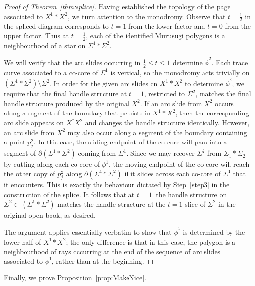 \documentclass{amsart}
\theoremstyle{definition}
\begin{document}
\begin{proof}[Proof of Theorem~\ref{thm:splice}]  Having  established the topology of the page associated to $X^1*X^2$, we turn attention to the monodromy.
Observe that $t=\frac{1}{2}$ in the spliced diagram corresponds to $t=1$ from the lower factor and $t=0$ from the upper factor.  Thus at $t=\frac{1}{2}$, each of the identified Murusugi polygons is a neighbourhood of a star on $\Sigma^1*\Sigma^2$.  

We will verify that the arc slides occurring in $\frac{1}{2}\leq t\leq 1$ determine $\overline{\phi}^2$.  Each trace curve associated to a co-core of $\Sigma^1$ is vertical, so the monodromy acts trivially on $(\Sigma^1*\Sigma^2)\setminus \Sigma^2$.  
In order for the given arc slides on $X^1*X^2$ to determine $\overline{\phi}^2$, we require that the final handle structure at $t=1$, restricted to $\Sigma^2$, matches the final handle structure produced by the original $X^2$. If an arc slide from $X^2$ occurs along a segment of the boundary that persists in $X^1*X^2$, then the corresponding arc slide appears on $X^*X^2$ and changes the handle structure identically.  However, an arc slide from $X^2$ may also occur along a segment of the boundary containing a point $p_j^2$.  In this case, the sliding endpoint of the co-core will pass into a segment of $\partial(\Sigma^1*\Sigma^2)$ coming from $\Sigma^1$. 
Since we may recover $\Sigma^2$ from $\Sigma_{1} * \Sigma_2$ by cutting along each co-core of $\phi^1$, the moving endpoint of the co-core will reach the other copy of $p_j^2$ along $\partial(\Sigma^1*\Sigma^2)$ if it slides across each co-core of $\Sigma^1$ that it encounters.  This is exactly the behaviour dictated by Step~\ref{step3} in the construction of the splice.  It follows that at $t=1$, the handle structure on $\Sigma^2\subset(\Sigma^1*\Sigma^2)$ matches the handle structure at the $t=1$ slice of $\Sigma^2$ in the original open book, as desired.  

The argument applies essentially verbatim to show that $\overline{\phi}^1$ is determined by the lower half of $X^1*X^2$; the only difference is that in this case, the polygon is a neighbourhood of rays occurring at the end of the sequence of arc slides associated to $\phi^1$, rather than at the beginning. \end{proof}

Finally, we prove Proposition~\ref{prop:MakeNice}.
\end{document}
